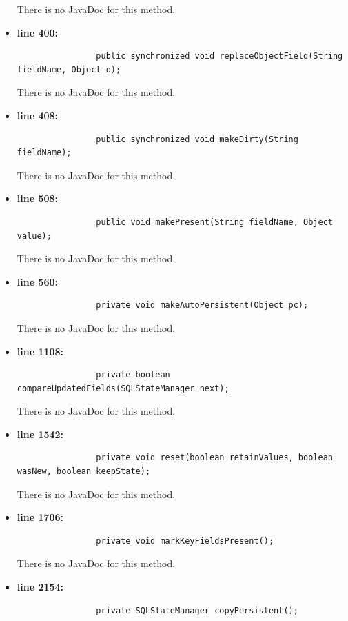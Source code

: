 \documentclass[18pt,oneside,a4paper, titlepage]{article}
\begin{document}
\begin{itemize}
\begin{lstlisting}
				\end{lstlisting}
				\vspace{0.1cm}
				There is no JavaDoc for this method.
				\item \textbf{line 400:} \begin{lstlisting}
				public synchronized void replaceObjectField(String fieldName, Object o);
				\end{lstlisting}
				\vspace{0.1cm}
				There is no JavaDoc for this method.
				\item \textbf{line 408:} \begin{lstlisting}
				public synchronized void makeDirty(String fieldName);
				\end{lstlisting}
				\vspace{0.1cm}
				
				There is no JavaDoc for this method.
				\item \textbf{line 508:} \begin{lstlisting}
				public void makePresent(String fieldName, Object value);
				\end{lstlisting}
				\vspace{0.1cm}
				
	
				There is no JavaDoc for this method.
				\item \textbf{line 560:} \begin{lstlisting}
				private void makeAutoPersistent(Object pc);
				\end{lstlisting}
				\vspace{0.1cm}
				
				There is no JavaDoc for this method.
				\item \textbf{line 1108:} \begin{lstlisting}
				private boolean compareUpdatedFields(SQLStateManager next);
				\end{lstlisting}
				\vspace{0.1cm}
				
				There is no JavaDoc for this method.
				\item \textbf{line 1542:} \begin{lstlisting}
				private void reset(boolean retainValues, boolean wasNew, boolean keepState);
				\end{lstlisting}
				\vspace{0.1cm}
				There is no JavaDoc for this method.
				\item \textbf{line 1706:} \begin{lstlisting}
				private void markKeyFieldsPresent();
				\end{lstlisting}
				\vspace{0.1cm}
				There is no JavaDoc for this method.
				\item \textbf{line 2154:} \begin{lstlisting}
				private SQLStateManager copyPersistent();
				\end{lstlisting}
				\vspace{0.1cm}
				

\end{itemize}
\end{document}
